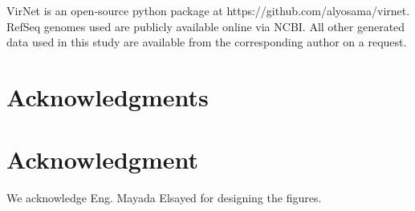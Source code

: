 \documentclass[10pt,journal,compsoc]{IEEEtran}
\begin{document}
VirNet is an open-source python package at https://github.com/alyosama/virnet. RefSeq genomes used are publicly available online via NCBI. All other generated data used in this study are available from the corresponding author on a request. 

\ifCLASSOPTIONcompsoc
  \section*{Acknowledgments}
\else
  \section*{Acknowledgment}
\fi

We acknowledge Eng. Mayada Elsayed for designing the figures.


\ifCLASSOPTIONcaptionsoff
  \newpage
\fi





%
%
%


\end{document}
